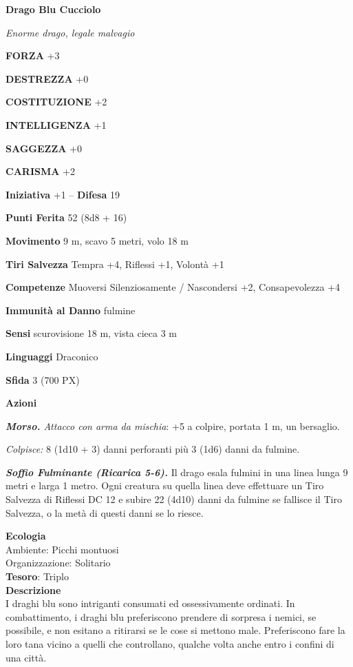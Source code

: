 \begin{multicols}{2}
	\medskip{}\textbf{Drago Blu Cucciolo}

	\textit{Enorme drago, legale malvagio}

	\textbf{FORZA} +3

	\textbf{DESTREZZA} +0

	\textbf{COSTITUZIONE} +2

	\textbf{INTELLIGENZA} +1

	\textbf{SAGGEZZA} +0

	\textbf{CARISMA} +2

	\textbf{Iniziativa} +1 -- \textbf{Difesa} 19

	\textbf{Punti Ferita} 52 (8d8 + 16)

	\textbf{Movimento} 9 m, scavo 5 metri, volo 18 m

	\textbf{Tiri Salvezza} Tempra +4, Riflessi +1, Volontà +1

	\textbf{Competenze} Muoversi Silenziosamente / Nascondersi +2, Consapevolezza +4

	\textbf{Immunità al Danno} fulmine

	\textbf{Sensi} scurovisione 18 m, vista cieca 3 m

	\textbf{Linguaggi} Draconico

	\textbf{Sfida} 3 (700 PX)

	\textbf{Azioni}

	\textit{\textbf{Morso.} Attacco con arma da mischia}: +5 a colpire, portata 1 m, un bersaglio.

	\textit{Colpisce:} 8 (1d10 + 3) danni perforanti più 3 (1d6) danni da fulmine.

	\textit{\textbf{Soffio Fulminante (Ricarica 5-6).}} Il drago esala fulmini in una linea lunga 9 metri e larga 1 metro. Ogni creatura su quella linea deve effettuare un Tiro Salvezza di Riflessi DC 12 e subire 22 (4d10) danni da fulmine se fallisce il Tiro Salvezza, o la metà di questi danni se lo riesce.

	\textbf{Ecologia}\\
	Ambiente: Picchi montuosi\\
	Organizzazione: Solitario\\
	\textbf{Tesoro}: Triplo\\
	\textbf{Descrizione}\\
	I draghi blu sono intriganti consumati ed ossessivamente ordinati. In combattimento, i draghi blu preferiscono prendere di sorpresa i nemici, se possibile, e non esitano a ritirarsi se le cose si mettono male. Preferiscono fare la loro tana vicino a quelli che controllano, qualche volta anche entro i confini di una città.


\end{multicols}
